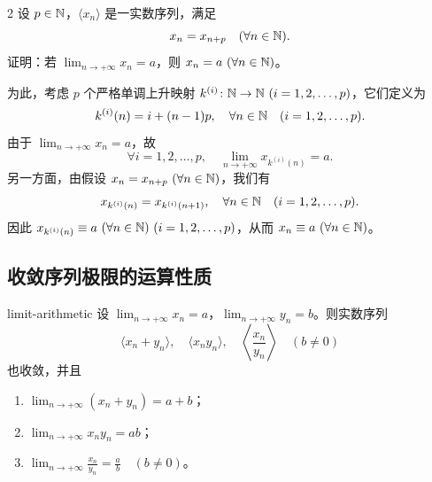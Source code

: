 \begin{sourceexample}{2}
设 \(p\in\mathbb{N}\)，\(\langle x_n\rangle\) 是一实数序列，满足
\[
x_n=x_{n+p}\quad(\forall n\in\mathbb{N}).
\]
证明：若 \(\lim_{n\to+\infty}x_n=a\)，则 \(x_n=a\ (\forall n\in\mathbb{N})\)。

为此，考虑 \(p\) 个严格单调上升映射 \(k^{(i)}\colon\N\to\N\ (i=1,2,\dots,p)\)，它们定义为
\[
k^{(i)}(n)=i+(n-1)p,\quad \forall n\in\mathbb{N}\quad(i=1,2,\dots,p).
\]
由于 \(\lim_{n\to+\infty}x_n=a\)，故
\[
\forall i=1,2,\dots,p,\quad
\lim_{n\to+\infty}x_{k^{(i)}(n)}=a.
\]
另一方面，由假设 \(x_n=x_{n+p}\ (\forall n\in\mathbb{N})\)，我们有
\[
x_{k^{(i)}(n)}=x_{k^{(i)}(n+1)},\quad
\forall n\in\mathbb{N}\quad(i=1,2,\dots,p).
\]
因此 \(x_{k^{(i)}(n)}\equiv a\ (\forall n\in\N)\ (i=1,2,\dots,p)\)，从而 \(x_n\equiv a\ (\forall n\in\N)\)。
\end{sourceexample}

\subsection{收敛序列极限的运算性质}

\begin{myproperty}{}{limit-arithmetic}
设 \(\lim_{n\to+\infty}x_n=a\)，\(\lim_{n\to+\infty}y_n=b\)。则实数序列
\[
\langle x_n+y_n\rangle,\quad \langle x_ny_n\rangle,\quad
\left\langle\frac{x_n}{y_n}\right\rangle\quad(b\ne0)
\]
也收敛，并且
\begin{enumerate}[label=\arabic*)]
  \item \(\displaystyle\lim_{n\to+\infty}(x_n+y_n)=a+b\)；
  \item \(\displaystyle\lim_{n\to+\infty}x_ny_n=ab\)；
  \item \(\displaystyle\lim_{n\to+\infty}\frac{x_n}{y_n}=\frac ab\quad(b\ne0)\)。
\end{enumerate}
\end{myproperty}

